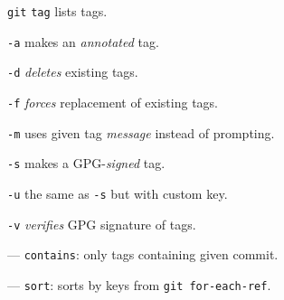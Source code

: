 %

\begin{compactenum}
\item [\texttt{git}] \texttt{tag} lists tags.
\item [\texttt{-a}] makes an \emph{annotated} tag.
\item [\texttt{-d}] \emph{deletes} existing tags.
\item [\texttt{-f}] \emph{forces} replacement of existing tags.
\item [\texttt{-m}] uses given tag \emph{message} instead of prompting.
\item [\texttt{-s}] makes a GPG-\emph{signed} tag.
\item [\texttt{-u}] the same as \texttt{-s} but with custom key.
\item [\texttt{-v}] \emph{verifies} GPG signature of tags.
\item [---] \texttt{contains}: only tags containing given commit.
\item [---] \texttt{sort}: sorts by keys from \texttt{git for-each-ref}.
\end{compactenum}

%